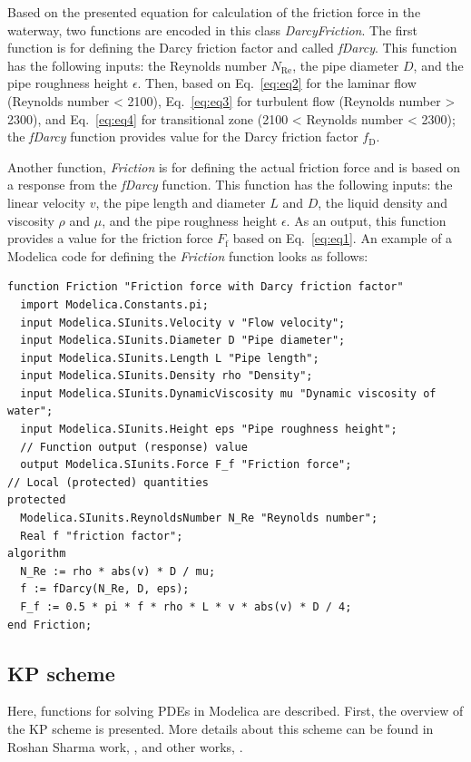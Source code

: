 \documentclass[%
]{USN-PhD}
\begin{document}
Based on the presented equation for calculation of the friction force in the waterway, two functions are encoded in this class \emph{DarcyFriction}. The first function is for defining the Darcy friction factor and called \emph{fDarcy}. This function has the following inputs: the Reynolds number $N_\mathrm{Re}$, the pipe diameter $D$, and the pipe roughness height $\epsilon$. Then, based on Eq.~\ref{eq:eq2} for the laminar flow (Reynolds number < 2100), Eq.~\ref{eq:eq3} for turbulent flow (Reynolds number > 2300), and Eq.~\ref{eq:eq4} for transitional zone (2100 < Reynolds number < 2300); the \emph{fDarcy} function provides value for the Darcy friction factor $f_\mathrm{D}$.

Another function, \emph{Friction} is for defining the actual friction force and is based on a response from the \emph{fDarcy} function. This function has the following inputs: the linear velocity $v$, the pipe length and diameter $L$ and $D$, the liquid density and viscosity $\rho$ and $\mu$, and the pipe roughness height $\epsilon$. As an output, this function provides a value for the friction force $F_\mathrm{f}$ based on Eq.~\ref{eq:eq1}. An example of a Modelica code for defining the \emph{Friction} function looks as follows:

\begin{lstlisting}[language = modelica]
function Friction "Friction force with Darcy friction factor"
  import Modelica.Constants.pi;
  input Modelica.SIunits.Velocity v "Flow velocity";
  input Modelica.SIunits.Diameter D "Pipe diameter";
  input Modelica.SIunits.Length L "Pipe length";
  input Modelica.SIunits.Density rho "Density";
  input Modelica.SIunits.DynamicViscosity mu "Dynamic viscosity of water";
  input Modelica.SIunits.Height eps "Pipe roughness height";
  // Function output (response) value
  output Modelica.SIunits.Force F_f "Friction force";
// Local (protected) quantities
protected
  Modelica.SIunits.ReynoldsNumber N_Re "Reynolds number";
  Real f "friction factor";
algorithm
  N_Re := rho * abs(v) * D / mu;
  f := fDarcy(N_Re, D, eps);
  F_f := 0.5 * pi * f * rho * L * v * abs(v) * D / 4;
end Friction;
\end{lstlisting}

\subsection{KP scheme}

Here, functions for solving PDEs in Modelica are described. First, the overview of the KP scheme is presented. More details about this scheme can be found in Roshan Sharma work, \cite{Sha:15}, and other works, \cite{Vyt:15,Vyt:17}.
\end{document}
